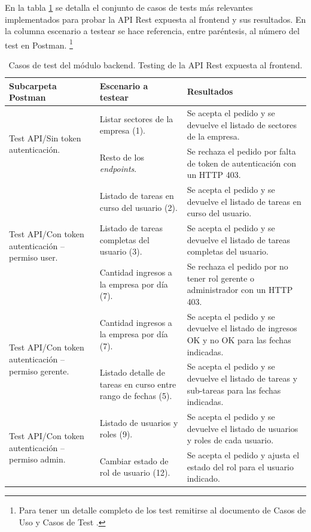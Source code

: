 En la tabla \ref{tab:tablaTestBackendFrontend} se detalla el conjunto de casos de tests más relevantes implementados para probar la API Rest expuesta al frontend y sus resultados. En la columna escenario a testear se hace referencia, entre paréntesis, al número del test en Postman.  \footnote{\label{notaReusadaCasosTest}Para tener un detalle completo de los test remitirse al documento de Casos de Uso y Casos de Test \citep{WEBSITE:CasosUsoYTest}.}


\begin{table}[h]
	\centering
	\caption[Tipos de pruebas backend]{Casos de test del módulo backend. Testing de la API Rest expuesta al frontend.}
	\begin{tabular}{p{3.5cm} p{3.5cm} p{5cm}} 	

		\toprule
		\textbf{Subcarpeta Postman} & 
		\textbf{Escenario a testear} &
		\textbf{Resultados} 
		\\
		\midrule

\multirow{2}{3.5cm}{Test API/Sin token autenticación.} & Listar sectores de la empresa (1). & Se acepta el pedido y se devuelve el listado de sectores de la empresa. \\
                    & Resto de los \textit{endpoints}. & Se rechaza el pedido por falta de token de autenticación con un HTTP 403. \\
\hline
\multirow{3}{3.5cm}{Test API/Con token autenticación – permiso user.} & Listado de tareas en curso del usuario (2). & Se acepta el pedido y se devuelve el listado de tareas en curso del usuario. \\
                    & Listado de tareas completas del usuario (3). & Se acepta el pedido y se devuelve el listado de tareas completas del usuario. \\
                    & Cantidad ingresos a la empresa por día (7). & Se rechaza el pedido por no tener rol gerente o administrador con un HTTP 403. \\
\hline
\multirow{2}{3.5cm}{Test API/Con token autenticación – permiso gerente.}  & Cantidad ingresos a la empresa por día (7). & Se acepta el pedido y se devuelve el listado de ingresos OK y no OK para las fechas indicadas. \\
                    & Listado detalle de tareas en curso entre rango de fechas (5). & Se acepta el pedido y se devuelve el listado de tareas y sub-tareas para las fechas indicadas. \\
\hline
\multirow{2}{3.5cm}{Test API/Con token autenticación – permiso admin.}  & Listado de usuarios y roles (9). & Se acepta el pedido y se devuelve el listado de usuarios y roles de cada usuario. \\
                    & Cambiar estado de rol de usuario (12). & Se acepta el pedido y ajusta el estado del rol para el usuario indicado. \\
		\bottomrule
		\hline
	\end{tabular}
	\label{tab:tablaTestBackendFrontend}
\end{table}

